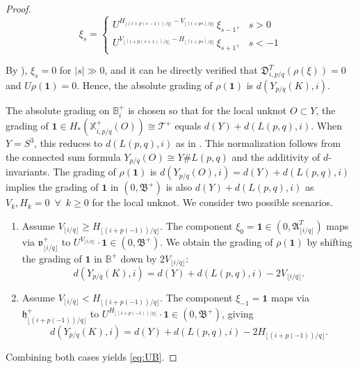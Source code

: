 \documentclass[12pt]{amsart}
\theoremstyle{definition}
\theoremstyle{definition}
\newcommand{\din}{d}
\begin{document}
\begin{proof}
\smallskip\noindent
\[ \xi_s = 
\begin{cases}  
U^{H_{\lfloor(i+p(s-1))/q\rfloor} - V_{\lfloor(i+ps)/q\rfloor}}\, \xi_{s-1}, & s>0\\

U^{V_{\lfloor(i+p(s+1))/q\rfloor} - H_{\lfloor(i+ps)/q\rfloor}}\, \xi_{s+1}, & s<-1
    
\end{cases}  \]

\smallskip
By \cite[Lemma~2.8]{NiWu}),
$\xi_s = 0$ for $|s| \gg 0$, and it can be directly verified that
$\mathfrak{D}^T_{i,p/q}(\rho(\xi)) = 0$ and $U\rho(\mathbf{1}) = 0$. Hence, the absolute grading of $\rho(\mathbf{1})$ is $\din(Y_{p/q}(K),i)$.

\smallskip

The absolute grading on $\mathbb{B}_i^+$ is chosen so that for the local unknot $O \subset Y$, the grading of $\mathbf{1} \in H_*(\mathbb{X}^+_{i,p/q}(O))
\cong \mathcal{T}^+$ equals $\din(Y) + \din(L(p,q),i)$. When $Y = S^3$, this
reduces to $\din(L(p,q),i)$ as in \cite[Remark~2.3]{NiWu}. This normalization follows from the connected sum formula
$Y_{p/q}(O) \cong Y \# L(p,q)$ and the additivity of $d$-invariants.
The grading of $\rho(\mathbf{1})$ is $\din(Y_{p/q}(O),i)=\din(Y) + \din(L(p,q),i)$ implies the grading of $\mathbf{1} $ in $(0,\mathfrak{B}^+)$ is also $\din(Y) + \din(L(p,q),i)$ as $V_k,H_k=0 \;\ \forall \;\ k\geq 0$ for the local unknot. We consider two possible scenarios.
\begin{enumerate}
    \item Assume $V_{\lfloor i/q \rfloor} \geq H_{\lfloor (i+p(-1))/q \rfloor}$. The component $\xi_0 = \mathbf{1} \in (0, \mathfrak{A}^T_{\lfloor i/q\rfloor})$
maps via $\mathfrak{v}^+_{\lfloor i/q\rfloor}$ to
$U^{V_{\lfloor i/q\rfloor}} \cdot \mathbf{1} \in (0, \mathfrak{B}^+)$.
We obtain the grading
of $\rho(\mathbf{1})$ by shifting the grading of  $\mathbf{1} $ in $\mathbb{B}^+$  down by $2V_{\lfloor i/q\rfloor}$:
\[
\din(Y_{p/q}(K),i) = \din(Y) + \din(L(p,q),i) - 2V_{\lfloor i/q\rfloor}.
\]

\item Assume $V_{\lfloor i/q \rfloor} < H_{\lfloor (i+p(-1))/q \rfloor}$. The component $\xi_{-1} = \mathbf{1}$ maps via
$\mathfrak{h}^+_{\lfloor(i+p(-1))/q\rfloor}$ to
$U^{H_{\lfloor(i+p(-1))/q\rfloor}} \cdot \mathbf{1} \in (0, \mathfrak{B}^+)$,
giving
\[
\din(Y_{p/q}(K),i) = \din(Y) + \din(L(p,q),i) - 2H_{\lfloor(i+p(-1))/q\rfloor}.
\]

\end{enumerate}
Combining both cases yields \eqref{eq:UB}.
 
\end{proof}
\end{document}

